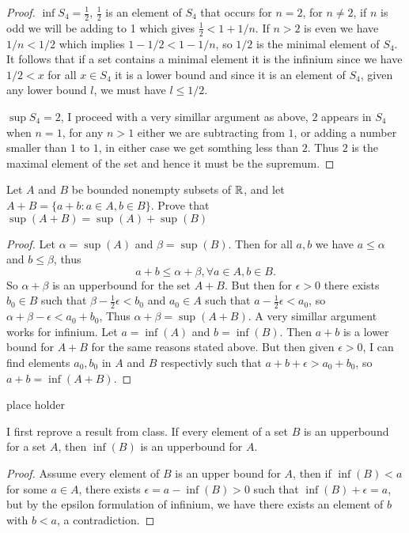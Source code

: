 \begin{proof}
$\inf S_4 = \frac{1}{2}$, $\frac{1}{2}$ is an element of $S_4$ that occurs for $n = 2$, for $n \neq 2$, if $n$ is odd we will be adding to 1 which 
gives $\frac{1}{2} < 1 + 1/n$. If $n>2$ is even we have $1/n < 1/2$ which implies $1 - 1/2 < 1 - 1/n$, so $1/2$ is the minimal element of $S_4$. It follows that 
if a set contains a minimal element it is the infinium since we have $1/2 < x$ for all $x \in S_4$ it is a lower bound and since it is an element of $S_4$, given any lower bound $l$, we must 
have $l \leq 1/2$. 

$\sup S_4 = 2$, I proceed with a very simillar argument as above, $2$ appears in $S_4$ when $n=1$, for any $n>1$ either we are subtracting from $1$, or adding a number smaller than $1$ to $1$, in either case 
we get somthing less than $2$. Thus $2$ is the maximal element of the set and hence it must be the supremum. 
\end{proof}


\question 
Let $A$ and $B$ be bounded nonempty subsets of $\mathbb{R}$, and let $A + B = \{a + b: a \in A, b \in B\}$. 
Prove that $\sup(A+B) = \sup(A) + \sup(B)$ 

\begin{proof}
    Let $\alpha = \sup (A)$ and $\beta = \sup (B)$. Then for all $a, b$ we have 
    $a \leq \alpha$ and $b \leq \beta$, thus 
    \[a + b \leq \alpha + \beta, \forall a \in A, b \in B. \] 
    So $\alpha + \beta $ is an upperbound for the set $A + B$. But then for $\epsilon > 0$ there exists $b_0 \in B$ such that 
    $ \beta - \frac{1}{2}\epsilon < b_0$ and $a_0 \in A$ such that $a - \frac{1}{2}\epsilon < a_0$, so $\alpha + \beta - \epsilon < a_0 + b_0$,
    Thus $\alpha + \beta = \sup( A + B)$. 
    A very simillar argument works for infinium. Let $a = \inf(A)$ and $b = \inf(B)$. Then $a + b$ is a lower bound for $A + B$ for the same reasons stated above. 
    But then given $\epsilon > 0$, I can find elements $a_0, b_0$ in $A$ and $B$ respectivly such that $a + b + \epsilon > a_0 + b_0$, so 
    $a + b = \inf(A + B)$. 
\end{proof}

\question 
place holder 

I first reprove a result from class. If every element of a set $B$ is an upperbound for a set $A$, then $\inf(B)$ is an upperbound for $A$. 
\begin{proof}
    Assume every element of $B$ is an upper bound for $A$, then if $\inf(B) < a$ for some $a \in A$, there exists $\epsilon = a - \inf(B) > 0$ such that $\inf(B) + \epsilon = a$, but 
    by the epsilon formulation of infinium, we have there exists an element of $b$ with $b < a$, a contradiction. 
\end{proof}

